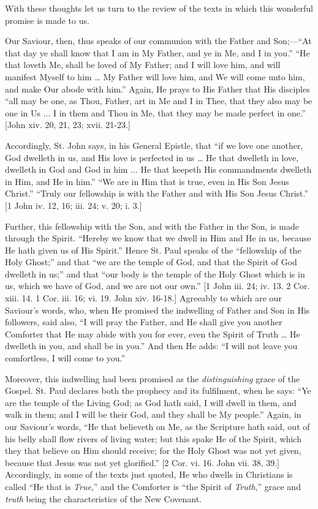 With these thoughts let us turn to the review of the texts in which
this wonderful promise is made to us.

Our Saviour, then, thus speaks of our communion with the Father and
Son;—``At that day ye shall know that I am in My Father, and ye
in Me, and I in you.'' ``He that loveth Me, shall be loved of
My Father; and I will love him, and will manifest Myself to him …
My Father will love him, and We will come unto him, and make Our abode
with him.'' Again, He prays to His Father that His disciples
``all may be one, as Thou, Father, art in Me and I in Thee, that
they also may be one in Us ... I in them and Thou in Me, that they may
be made perfect in one.'' [John xiv. 20, 21, 23; xvii. 21-23.]

Accordingly, St. John says, in his General Epistle, that ``if
we love one another, God dwelleth in us, and His love is perfected in
us … He that dwelleth in love, dwelleth in God and God in him ... He
that keepeth His commandments dwelleth in Him, and He in him.''
``We are in Him that is true, even in His Son Jesus Christ.''
``Truly our fellowship is with the Father and with His Son Jesus
Christ.'' [1 John iv. 12, 16; iii. 24; v. 20; i. 3.]

Further, this fellowship with the Son, and with the Father in
the Son, is made through the Spirit. ``Hereby we know that we
dwell in Him and He in us, because He hath given us of His
Spirit.'' Hence St. Paul speaks of the ``fellowship of the
Holy Ghost;'' and that ``we are the temple of God, and that
the Spirit of God dwelleth in us;'' and that ``our body is the
temple of the Holy Ghost which is in us, which we have of God, and we
are not our own.'' [1 John iii. 24; iv. 13. 2 Cor. xiii. 14. 1 Cor.
iii. 16; vi. 19. John xiv. 16-18.] Agreeably to which are our
Saviour's words, who, when He promised the indwelling of Father and
Son in His followers, said also, ``I will pray the Father, and He
shall give you another Comforter that He may abide with you for ever,
even the Spirit of Truth … He dwelleth in you, and shall be in
you.'' And then He adds: ``I will not leave you comfortless, I
will come to you.''

Moreover, this indwelling had been promised as the \emph{distinguishing}
grace of the Gospel. St. Paul declares both the prophecy and its
fulfilment, when he says: ``Ye are the temple of the Living God;
as God hath said, I will dwell in them, and walk in them; and I will
be their God, and they shall be My people.'' Again, in our
Saviour's words, ``He that believeth on Me, as the Scripture hath
said, out of his belly shall flow rivers of living water; but this
spake He of the Spirit, which they that believe on Him should receive;
for the Holy Ghost was not yet given, because that Jesus was not yet
glorified.'' [2 Cor. vi. 16. John vii. 38, 39.] Accordingly, in
some of the texts just quoted, He who dwells in Christians is called
``He that is \emph{True},'' and the Comforter is
``the Spirit of \emph{Truth},'' grace and \emph{truth} being
the characteristics of the New Covenant.

